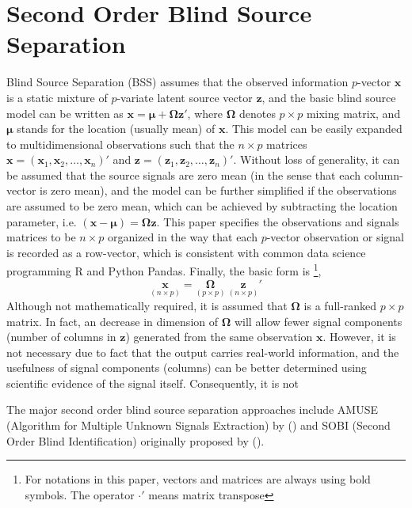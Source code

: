 \documentclass[utf8,english]{gradu3}
\begin{document}
\chapter{Second Order Blind Source Separation}

Blind Source Separation (BSS) assumes that the observed information $p$-vector $\boldsymbol{x}$ is a static mixture of $p$-variate latent source vector $\boldsymbol{z}$, and the basic blind source model can be written as $\boldsymbol{x} = \boldsymbol{\mu} + \boldsymbol{\Omega z}'$, where $\boldsymbol{\Omega}$ denotes $p\times p$ mixing matrix, and $\boldsymbol{\mu}$ stands for the location (usually mean) of $\boldsymbol{x}$. This model can be easily expanded to multidimensional observations such that the $n\times p$ matrices $\boldsymbol{x}=(\boldsymbol{x}_1, \boldsymbol{x}_2,\dots,\boldsymbol{x}_n)'$ and $\boldsymbol{z}=(\boldsymbol{z}_1, \boldsymbol{z}_2,\dots,\boldsymbol{z}_n)'$. Without loss of generality, it can be assumed that the source signals are zero mean (in the sense that each column-vector is zero mean), and the model can be further simplified if the observations are assumed to be zero mean, which can be achieved by subtracting the location parameter, i.e. $(\boldsymbol{x} - \boldsymbol{\mu}) = \boldsymbol{\Omega z}$. This paper specifies the observations and signals matrices to be $n\times p$ organized in the way that each $p$-vector observation or signal is recorded as a row-vector, which is consistent with common data science programming R and Python Pandas. Finally, the basic form is \footnote{For notations in this paper, vectors and matrices are always using bold symbols. The operator $\cdot'$ means matrix transpose},
\begin{equation}
\label{eq:SOM}
    \underset{(n\times p)}{\boldsymbol x} = \underset{(p\times p)}{\boldsymbol{\Omega}} \ \underset{(n\times p)}{\boldsymbol{z}}'
\end{equation}
Although not mathematically required, it is assumed that $\boldsymbol{\Omega}$ is a full-ranked $p\times p$ matrix. In fact, an decrease in dimension of $\boldsymbol{\Omega}$ will allow fewer signal components (number of columns in $\boldsymbol z$) generated from the same observation $\boldsymbol{x}$. However, it is not necessary due to fact that the output carries real-world information, and the usefulness of signal components (columns) can be better determined using scientific evidence of the signal itself. Consequently, it is not 

The major second order blind source separation approaches include AMUSE (Algorithm for Multiple Unknown Signals Extraction) by \citeauthor{tong1990amuse} (\citeyear{tong1990amuse}) and SOBI (Second Order Blind Identification) originally proposed by \citeauthor{belouchrani1997blind} (\citeyear{belouchrani1997blind}).
\end{document}
